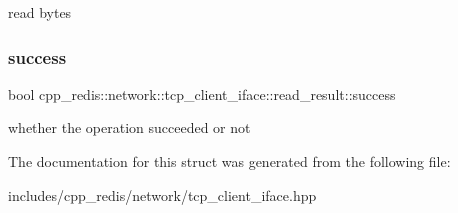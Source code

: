 read bytes \mbox{\label{structcpp__redis_1_1network_1_1tcp__client__iface_1_1read__result_ab9a3a54474c382a00323ed02f4239faa}} 
\subsubsection{\texorpdfstring{success}{success}}
{\footnotesize\ttfamily bool cpp\+\_\+redis\+::network\+::tcp\+\_\+client\+\_\+iface\+::read\+\_\+result\+::success}

whether the operation succeeded or not 

The documentation for this struct was generated from the following file\+:\begin{DoxyCompactItemize}
\item 
includes/cpp\+\_\+redis/network/tcp\+\_\+client\+\_\+iface.\+hpp\end{DoxyCompactItemize}
